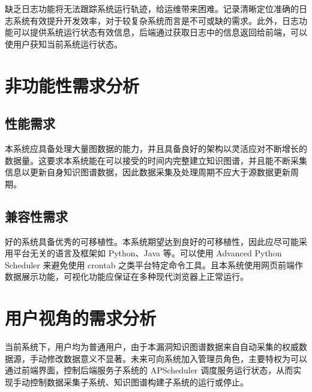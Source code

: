 \documentclass[a4paper,AutoFakeBold,oneside,12pt]{book}
\begin{document}
缺乏日志功能将无法跟踪系统运行轨迹，给运维带来困难。记录清晰定位准确的日志系统有效提升开发效率，对于较复杂系统而言是不可或缺的需求。此外，日志功能可以提供系统运行状态有效信息，后端通过获取日志中的信息返回给前端，可以使用户获知当前系统运行状态。

\section{非功能性需求分析}

\subsection{性能需求}

本系统应具备处理大量图数据的能力，并且具备良好的架构以灵活应对不断增长的数据量。这要求本系统能在可以接受的时间内完整建立知识图谱，并且能不断采集信息以更新自身知识图谱数据，因此数据采集及处理周期不应大于源数据更新周期。

\subsection{兼容性需求}

好的系统具备优秀的可移植性。本系统期望达到良好的可移植性，因此应尽可能采用平台无关的语言及框架如 Python、Java 等。可以使用 Advanced Python Scheduler 来避免使用 crontab 之类平台特定命令工具。且本系统使用网页前端作数据展示功能，可视化功能应保证在多种现代浏览器上正常运行。

\section{用户视角的需求分析}

当前系统下，用户均为普通用户，由于本漏洞知识图谱数据来自自动采集的权威数据源，手动修改数据意义不显著。未来可向系统加入管理员角色，主要特权为可以通过前端界面，控制后端服务子系统的 APScheduler 调度服务运行状态，从而实现手动控制数据采集子系统、知识图谱构建子系统的运行或停止。
\end{document}
